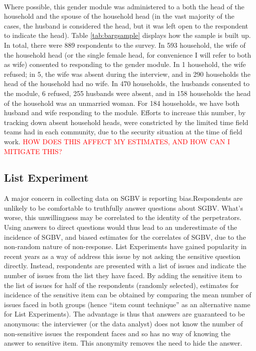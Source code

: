 \documentclass[11pt,a4paper]{scrartcl} %
\begin{document}
\paragraph{}
Where possible, this gender module was administered to a both the head of the household and the spouse of the household head (in the vast majority of the cases, the husband is considered the head, but it was left open to the respondent to indicate the head). Table \ref{tab:bargsample} displays how the sample is built up. In total, there were 889 respondents to the survey. In 593 household, the wife of the household head (or the single female head, for convenience I will refer to both as wife) consented to responding to the gender module. In 1 household, the wife refused; in 5, the wife was absent during the interview, and in 290 households the head of the household had no wife. In 470 households, the husbands consented to the module, 6 refused, 255 husbands were absent, and in 158 households the head of the household was an unmarried woman. For 184 households, we have both husband and wife responding to the module. Efforts to increase this number, by tracking down absent household heads, were constricted by the limited time field teams had in each community, due to the security situation at the time of field work. \textcolor{red}{HOW DOES THIS AFFECT MY ESTIMATES, AND HOW CAN I MITIGATE THIS?}


\subsection*{List Experiment}
A major concern in collecting data on SGBV is reporting bias.Respondents are unlikely to be comfortable to truthfully answer questions about SGBV. What's worse, this unwillingness may be correlated to the identity of the perpetrators\citep{Stark2017}. Using answers to direct questions would thus lead to an underestimate of the incidence of SGBV, and biased estimates for the correlates of SGBV, due to the non-random nature of non-response. List Experiments have gained popularity in recent years as a way of address this issue by not asking the sensitive question directly. Instead, respondents are presented with a list of issues and indicate the number of issues from the list they have faced. By adding the sensitive item to the list of issues for half of the respondents (randomly selected), estimates for incidence of the sensitive item can be obtained by comparing the mean number of issues faced in both groups (hence ``item count technique'' as an alternative name for List Experiments). The advantage is thus that answers are guaranteed to be anonymous: the interviewer (or the data analyst) does not know the number of non-sensitive issues the respondent faces and so has no way of knowing the answer to sensitive item. This anonymity removes the need to hide the answer. 
\end{document}
